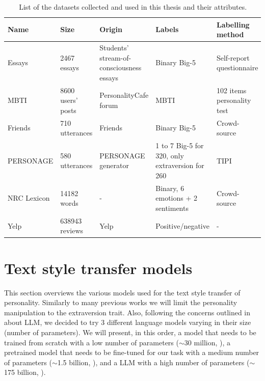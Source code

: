 \documentclass[nomenclature, english, biblatex]{kththesis}
\begin{document}
\begin{table}
    \centering
    \begin{adjustbox}{max width=\textwidth}
        \begin{tabular}{|p{}|p{}|p{}|p{}|p{}|}
        \hline
        Name & Size & Origin & Labels & Labelling method \\
        \hline
        \hline
        Essays & 2467 essays & Students' stream-of-consciousness essays & Binary Big-5 & Self-report questionnaire\\
        \hline
        MBTI & 8600 users' posts & PersonalityCafe forum & \gls{MBTI} & 102 items personality test\\
        \hline
        Friends & 710 utterances & Friends & Binary Big-5 & Crowd-source\\
        \hline
        PERSONAGE & 580 utterances & PERSONAGE generator & 1 to 7 Big-5 for 320, only extraversion for 260 & \gls{TIPI}~\cite{gosling2003very}\\
        \hline
        NRC Lexicon & 14182 words & - & Binary,  6 emotions + 2 sentiments & Crowd-source\\
        \hline
        Yelp & 638943 reviews & Yelp & Positive/negative & -\\
        \hline
        \end{tabular}
    \end{adjustbox}
    \caption{List of the datasets collected and used in this thesis and their attributes.}
    \label{tab:datasets}
\end{table}
\section{Text style transfer models}
This section overviews the various models used for the text style transfer of personality. Similarly to many previous works we will limit the personality manipulation to the extraversion trait. Also, following the concerns outlined in  about \gls{LLM}, we decided to try 3 different language models varying in their size (number of parameters). We will present, in this order, a model that needs to be trained from scratch with a low number of parameters ($\sim$30 million, ), a pretrained model that needs to be fine-tuned for our task with a medium number of parameters ($\sim$1.5 billion, ), and a \gls{LLM} with a high number of parameters ($\sim$175 billion, ).
\end{document}

